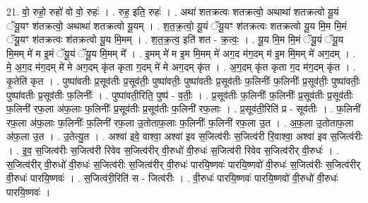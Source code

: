 \documentclass[17pt]{extarticle}
\begin{document}
21. वो॒ रुहो॒ रुहो॑ वो वो॒ रुहः॑ । . रुह॒ इति॒ रुहः॑ । . अथा॑ शतक्रत्वः शतक्रत्वो॒ अथाथा॑ शतक्रत्वो यू॒यं ॅयू॒यꣳ श॑तक्रत्वो॒ अथाथा॑ शतक्रत्वो यू॒यम् । . श॒त॒क्र॒त्वो॒ यू॒यं ॅयू॒यꣳ श॑तक्रत्वः शतक्रत्वो यू॒य मि॒म मि॒मं ॅयू॒यꣳ श॑तक्रत्वः श॑तक्रत्वो यू॒य मि॒मम् । . श॒त॒क्र॒त्व॒ इति॑ शत - क्र॒त्वः॒ । . यू॒य मि॒म मि॒मं ॅयू॒यं ॅयू॒य मि॒मम् मे॑ म इ॒मं ॅयू॒यं ॅयू॒य मि॒मम् मे᳚ । . इ॒मम् मे॑ म इ॒म मि॒मम् मे॑ अग॒द म॑ग॒दम् म॑ इ॒म मि॒मम् मे॑ अग॒दम् । . मे॒ अ॒ग॒द म॑ग॒दम् मे॑ मे अग॒दम् कृ॑त कृता ग॒दम् मे॑ मे अग॒दम् कृ॑त । . अ॒ग॒दम् कृ॑त कृता ग॒द म॑ग॒दम् कृ॑त । . कृ॒तेति॑ कृत । . पुष्पा॑वतीः प्र॒सूव॑तीः प्र॒सूव॑तीः॒ पुष्पा॑वतीः॒ पुष्पा॑वतीः प्र॒सूव॑तीः फ॒लिनीः᳚ फ॒लिनीः᳚ प्र॒सूव॑तीः॒ पुष्पा॑वतीः॒ पुष्पा॑वतीः प्र॒सूव॑तीः फ॒लिनीः᳚ । . पुष्पा॑वती॒रिति॒ पुष्प॑ - व॒तीः॒ । . प्र॒सूव॑तीः फ॒लिनीः᳚ फ॒लिनीः᳚ प्र॒सूव॑तीः प्र॒सूव॑तीः फ॒लिनी॑ रफ॒ला अ॑फ॒लाः फ॒लिनीः᳚ प्र॒सूव॑तीः प्र॒सूव॑तीः फ॒लिनी॑ रफ॒लाः । . प्र॒सूव॑ती॒रिति॑ प्र - सूव॑तीः । . फ॒लिनी॑ रफ॒ला अ॑फ॒लाः फ॒लिनीः᳚ फ॒लिनी॑ रफ॒ला उ॒तोताफ॒लाः फ॒लिनीः᳚ फ॒लिनी॑ रफ॒ला उ॒त । . अ॒फ॒ला उ॒तोताफ॒ला अ॑फ॒ला उ॒त । . उ॒तेत्यु॒त । . अश्वा॑ इवे॒ वाश्वा॒ अश्वा॑ इव स॒जित्व॑रीः स॒जित्व॑री रि॒वाश्वा॒ अश्वा॑ इव स॒जित्व॑रीः । . इ॒व॒ स॒जित्व॑रीः स॒जित्व॑री रिवेव स॒जित्व॑रीर् वी॒रुधो॑ वी॒रुधः॑ स॒जित्व॑री रिवेव स॒जित्व॑रीर् वी॒रुधः॑ । . स॒जित्व॑रीर् वी॒रुधो॑ वी॒रुधः॑ स॒जित्व॑रीः स॒जित्व॑रीर् वी॒रुधः॑ पारयि॒ष्णवः॑ पारयि॒ष्णवो॑ वी॒रुधः॑ स॒जित्व॑रीः स॒जित्व॑रीर् वी॒रुधः॑ पारयि॒ष्णवः॑ । . स॒जित्व॑री॒रिति॑ स - जित्व॑रीः । . वी॒रुधः॑ पारयि॒ष्णवः॑ पारयि॒ष्णवो॑ वी॒रुधो॑ वी॒रुधः॑ पारयि॒ष्णवः॑ । \newline
\end{document}
